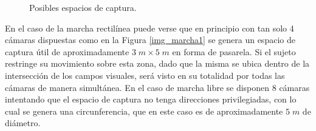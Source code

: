  
\begin{figure}[H]
  \centering
  \hspace{-1cm}
   \hspace{0.3cm}
     \caption{Posibles espacios de captura.}
  \label{img_espacio_capura}
\end{figure} 
 
En el caso de la marcha rectilínea puede verse que en principio con tan solo 4 cámaras dispuestas como en la Figura \ref{img_marcha1} se genera un espacio de captura útil de aproximadamente $3\;m\times5\; m$ en forma de pasarela. Si el sujeto restringe su movimiento sobre esta zona, dado que la misma se ubica dentro de la intersección de los campos visuales, será visto en su totalidad por todas las cámaras de manera simultánea. En el caso de marcha libre se disponen 8 cámaras intentando que el espacio de captura no tenga direcciones privilegiadas, con lo cual se genera una circunferencia, que en este caso es de aproximadamente $5\;m$ de diámetro. 


